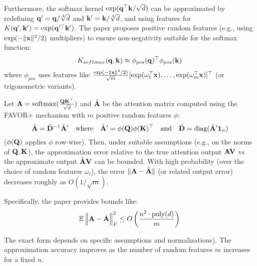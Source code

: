 \documentclass[aspectratio=169]{beamer}
\begin{document}
\begin{frame}
	Furthermore, the softmax kernel $\exp(\mathbf{q}^\top \mathbf{k} / \sqrt{d})$
	can be approximated by redefining $\mathbf{q}' = \mathbf{q}/\sqrt[4]{d}$ and
	$\mathbf{k}' = \mathbf{k}/\sqrt[4]{d}$, and using features for $K(\mathbf{q}',
		\mathbf{k}') = \exp(\mathbf{q}'^\top \mathbf{k}')$. The paper proposes positive
	random features (e.g., using $\exp(-\Vert \mathbf{x} \Vert^2 / 2)$
	multipliers) to ensure non-negativity suitable for the softmax function: $$
		K_{softmax}(\mathbf{q}, \mathbf{k}) \approx \phi_{pos}(\mathbf{q})^\top
		\phi_{pos}(\mathbf{k}) $$ where $\phi_{pos}$ uses features like $
		\frac{\exp(-\Vert \mathbf{x} \Vert^2 / 2)}{\sqrt{m}} [\exp(\omega_1^\top
			\mathbf{x}), \dots, \exp(\omega_m^\top \mathbf{x})]^\top$ (or trigonometric
	variants).
\end{frame}

\begin{frame}
	\begin{corollary} \label{cor:performer_error_bound}

		Let $\mathbf{A} = \mathrm{softmax}(\frac{\mathbf{Q}\mathbf{K}^\top}{\sqrt{d}})$ and
		$\hat{\mathbf{A}}$ be the attention matrix computed using the FAVOR+
		mechanism with $m$ positive random features $\phi$: $$ \hat{\mathbf{A}} =
		\hat{\mathbf{D}}^{-1} \hat{\mathbf{A}}' \quad \text{where} \quad
		\hat{\mathbf{A}}' = \phi(\mathbf{Q}) \phi(\mathbf{K})^\top \quad \text{and} \quad
		\hat{\mathbf{D}} = \mathop{\mathrm{diag}}(\hat{\mathbf{A}}' \mathbf{1}_n) $$ ($\phi(\mathbf{Q})$
		applies $\phi$ row-wise). Then, under suitable assumptions (e.g., on the
		norms of $\mathbf{Q}, \mathbf{K}$), the approximation error relative to the
		true attention output $\mathbf{A}\mathbf{V}$ vs the approximate output
		$\hat{\mathbf{A}}\mathbf{V}$ can be bounded. With high probability (over the
		choice of random features $\omega_i$), the error $\Vert \mathbf{A} -
		\hat{\mathbf{A}} \Vert$ (or related output error) decreases roughly as
		$O(1/\sqrt{m})$.

		Specifically, the paper provides bounds like: $$ \mathbb{E} \left\Vert \mathbf{A} -
		\hat{\mathbf{A}} \right\Vert_F^2 \le O\left(\frac{n^2 \cdot
		\text{poly}(d)}{m}\right) $$
	\end{corollary}
	\pause

	The exact form depends on specific assumptions and normalizations). The
	approximation accuracy improves as the number of random features $m$ increases
	for a fixed $n$.
\end{frame}
\end{document}
